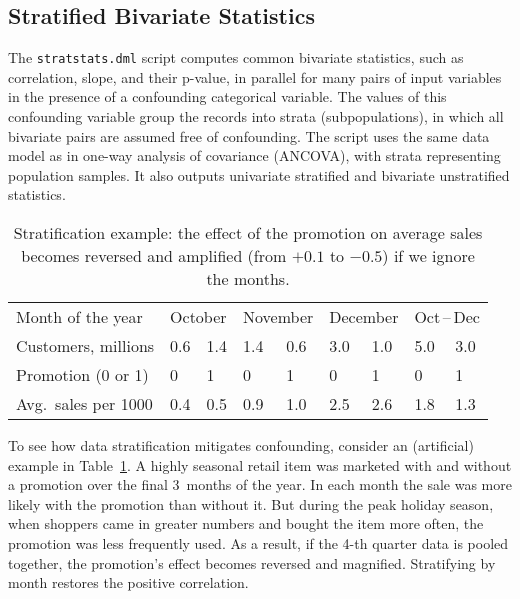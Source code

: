 \subsection{Stratified Bivariate Statistics}

\smallskip

The {\tt stratstats.dml} script computes common bivariate statistics, such
as correlation, slope, and their p-value, in parallel for many pairs of input
variables in the presence of a confounding categorical variable.  The values
of this confounding variable group the records into strata (subpopulations),
in which all bivariate pairs are assumed free of confounding.  The script
uses the same data model as in one-way analysis of covariance (ANCOVA), with
strata representing population samples.  It also outputs univariate stratified
and bivariate unstratified statistics.

\begin{table}[t]\hfil
\begin{tabular}{|l|ll|ll|ll||ll|}
\hline
Month of the year & \multicolumn{2}{l|}{October} & \multicolumn{2}{l|}{November} &
    \multicolumn{2}{l||}{December} & \multicolumn{2}{c|}{Oct$\,$--$\,$Dec} \\
Customers, millions    & 0.6 & 1.4 & 1.4 & 0.6 & 3.0 & 1.0 & 5.0 & 3.0 \\
\hline
Promotion (0 or 1)     & 0   & 1   & 0   & 1   & 0   & 1   & 0   & 1   \\
Avg.\ sales per 1000   & 0.4 & 0.5 & 0.9 & 1.0 & 2.5 & 2.6 & 1.8 & 1.3 \\
\hline
\end{tabular}\hfil
\caption{Stratification example: the effect of the promotion on average sales
becomes reversed and amplified (from $+0.1$ to $-0.5$) if we ignore the months.}
\label{table:stratexample}
\end{table}

To see how data stratification mitigates confounding, consider an (artificial)
example in Table~\ref{table:stratexample}.  A highly seasonal retail item
was marketed with and without a promotion over the final 3~months of the year.
In each month the sale was more likely with the promotion than without it.
But during the peak holiday season, when shoppers came in greater numbers and
bought the item more often, the promotion was less frequently used.  As a result,
if the 4-th quarter data is pooled together, the promotion's effect becomes
reversed and magnified.  Stratifying by month restores the positive correlation.

